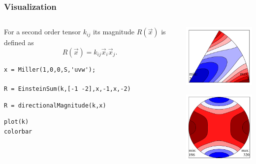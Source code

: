 \documentclass[compress]{beamer}
\begin{document}
\begin{frame}[fragile]
  \frametitle{Visualization}

  \begin{columns}
    \begin{column}{8.3cm}

      For a second order tensor $k_{ij}$ its magnitude $R(\vec x)$ is defined as
      \begin{equation*}
        R(\vec x) = k_{ij} \vec x_{i} \vec x_{j}.
      \end{equation*}

\pause
\medskip

\begin{lstlisting}[style=input]
x = Miller(1,0,0,S,'uvw');

R = EinsteinSum(k,[-1 -2],x,-1,x,-2)
\end{lstlisting}

\pause
\medskip


\begin{lstlisting}[style=input]
R = directionalMagnitude(k,x)
\end{lstlisting}


\pause
\medskip

  \begin{lstlisting}[style=input]
plot(k)
colorbar
  \end{lstlisting}

    \end{column}
    \begin{column}{3.7cm}
      \includegraphics[width=4cm]{pic/tensor1}

      \includegraphics[width=4cm]{pic/tensor}
    \end{column}

  \end{columns}

\end{frame}
\end{document}
